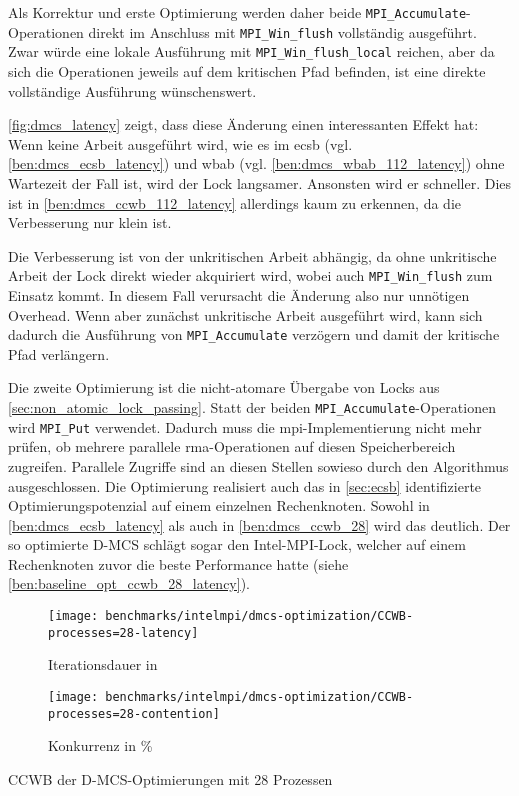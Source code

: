 Als Korrektur und erste Optimierung werden daher beide \texttt{MPI\_Accumulate}-Operationen direkt im Anschluss mit \texttt{MPI\_Win\_flush} vollständig ausgeführt.
Zwar würde eine lokale Ausführung mit \texttt{MPI\_Win\_flush\_local} reichen,
aber da sich die Operationen jeweils auf dem kritischen Pfad befinden,
ist eine direkte vollständige Ausführung wünschenswert.

\autoref{fig:dmcs_latency} zeigt,
dass diese Änderung einen interessanten Effekt hat:
Wenn keine Arbeit ausgeführt wird,
wie es im \gls{ecsb} (vgl. \autoref{ben:dmcs_ecsb_latency})
und \gls{wbab} (vgl. \autoref{ben:dmcs_wbab_112_latency}) ohne Wartezeit der Fall ist,
wird der Lock langsamer.
Ansonsten wird er schneller.
Dies ist in \autoref{ben:dmcs_ccwb_112_latency} allerdings kaum zu erkennen,
da die Verbesserung nur klein ist.

Die Verbesserung ist von der unkritischen Arbeit abhängig,
da ohne unkritische Arbeit der Lock direkt wieder akquiriert wird,
wobei auch \texttt{MPI\_Win\_flush} zum Einsatz kommt.
In diesem Fall verursacht die Änderung also nur unnötigen Overhead.
Wenn aber zunächst unkritische Arbeit ausgeführt wird,
kann sich dadurch die Ausführung von \texttt{MPI\_Accumulate} verzögern
und damit der kritische Pfad verlängern.

Die zweite Optimierung ist die nicht-atomare Übergabe von Locks aus \autoref{sec:non_atomic_lock_passing}.
Statt der beiden \texttt{MPI\_Accumulate}-Operationen wird \texttt{MPI\_Put} verwendet.
Dadurch muss die \gls{mpi}-Implementierung nicht mehr prüfen,
ob mehrere parallele \gls{rma}-Operationen auf diesen Speicherbereich zugreifen.
Parallele Zugriffe sind an diesen Stellen sowieso durch den Algorithmus ausgeschlossen.
Die Optimierung realisiert auch das in \autoref{sec:ecsb} identifizierte Optimierungspotenzial auf einem einzelnen Rechenknoten.
Sowohl in \autoref{ben:dmcs_ecsb_latency}
als auch in \autoref{ben:dmcs_ccwb_28} wird das deutlich.
Der so optimierte D-MCS schlägt sogar den Intel-MPI-Lock,
welcher auf einem Rechenknoten zuvor die beste Performance hatte
(siehe \autoref{ben:baseline_opt_ccwb_28_latency}).

\begin{benchmark}[h]
    \begin{subfigure}{.5\textwidth}
        \texttt{[image: benchmarks/intelmpi/dmcs-optimization/CCWB-processes=28-latency]}
        \caption{Iterationsdauer in }
        \label{ben:dmcs_ccwb_28_latency}
    \end{subfigure}
    \begin{subfigure}{.5\textwidth}
        \texttt{[image: benchmarks/intelmpi/dmcs-optimization/CCWB-processes=28-contention]}
        \caption{Konkurrenz in \%}
        \label{ben:dmcs_ccwb_28_contention}
    \end{subfigure}
    \caption{CCWB der D-MCS-Optimierungen mit 28 Prozessen}
    \label{ben:dmcs_ccwb_28}
\end{benchmark}

